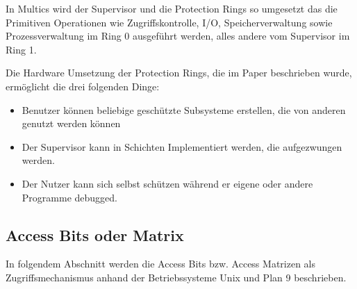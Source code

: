 \documentclass[11pt,technote]{IEEEtran}
\begin{document}
    
        In Multics wird der Supervisor und die Protection Rings so umgesetzt das die Primitiven Operationen wie Zugriffskontrolle, I/O, Speicherverwaltung sowie
        Prozessverwaltung im Ring 0 ausgef\"uhrt werden, alles andere vom Supervisor im Ring 1.
    
        Die Hardware Umsetzung der Protection Rings, die im Paper \cite{inproc:protec-rings} beschrieben wurde, erm\"oglicht die drei folgenden Dinge:
		    \begin{itemize}
		      \item Benutzer k\"onnen beliebige gesch\"utzte Subsysteme erstellen, die von anderen genutzt werden k\"onnen
		      \item Der Supervisor kann in Schichten Implementiert werden, die aufgezwungen werden.
		      \item Der Nutzer kann sich selbst sch\"utzen w\"ahrend er eigene oder andere Programme debugged.
		    \end{itemize}
    
    \subsection{Access Bits oder Matrix} \label{sec:secure:access}
      In folgendem Abschnitt werden die Access Bits bzw. Access Matrizen als Zugriffsmechanismus anhand der Betriebssysteme Unix und Plan 9 beschrieben.
\end{document}
